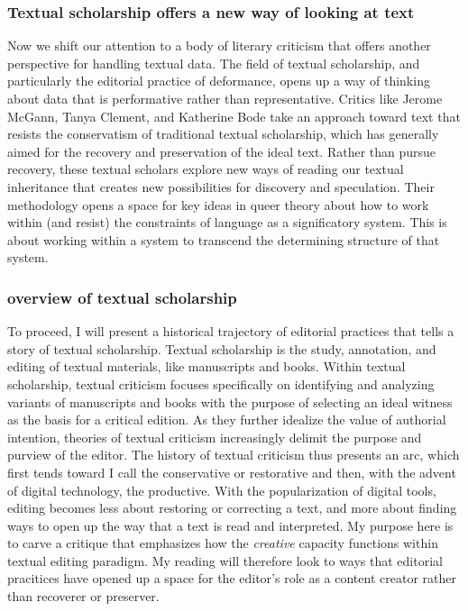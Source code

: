\documentclass[11pt]{article}
\begin{document}
\subsubsection{Textual scholarship offers a new way of looking at text}
\label{sec:org6ff07be}
Now we shift our attention to a body of literary criticism that offers
another perspective for handling textual data. The field of textual
scholarship, and particularly the editorial practice of deformance,
opens up a way of thinking about data that is performative rather than
representative. Critics like Jerome McGann, Tanya Clement, and
Katherine Bode take an approach toward text that resists the
conservatism of traditional textual scholarship, which has generally
aimed for the recovery and preservation of the ideal text. Rather than
pursue recovery, these textual scholars explore new ways of reading
our textual inheritance that creates new possibilities for discovery
and speculation. Their methodology opens a space for key ideas in
queer theory about how to work within (and resist) the constraints of
language as a significatory system. This is about working within a
system to transcend the determining structure of that system.

\subsubsection{overview of textual scholarship}
\label{sec:orgf98778a}
To proceed, I will present a historical trajectory of editorial
practices that tells a story of textual scholarship. Textual
scholarship is the study, annotation, and editing of textual
materials, like manuscripts and books. Within textual scholarship,
textual criticism focuses specifically on identifying and analyzing
variants of manuscripts and books with the purpose of selecting an
ideal witness as the basis for a critical edition. As they further
idealize the value of authorial intention, theories of textual
criticism increasingly delimit the purpose and purview of the
editor. The history of textual criticism thus presents an arc, which
first tends toward I call the conservative or restorative and then,
with the advent of digital technology, the productive. With the
popularization of digital tools, editing becomes less about restoring
or correcting a text, and more about finding ways to open up the way
that a text is read and interpreted. My purpose here is to carve a
critique that emphasizes how the \emph{creative} capacity functions within
textual editing paradigm. My reading will therefore look to ways that
editorial pracitices have opened up a space for the editor's role as a
content creator rather than recoverer or preserver.
\end{document}

